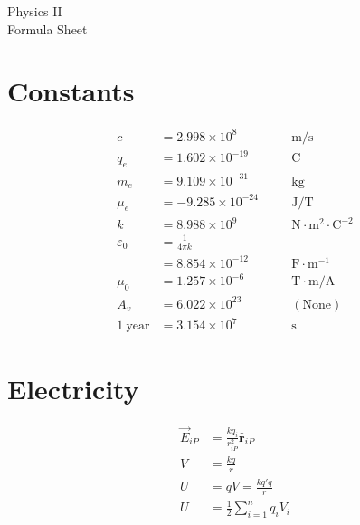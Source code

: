 \documentclass[10pt]{article}
\newcommand{\scinot}[2]{\ensuremath{#1 \times 10^{#2}}}
\begin{document}
\raggedleft
\footnotesize
\begin{multicols*}{5}

\setlength{\premulticols}{1pt}
\setlength{\postmulticols}{1pt}
\setlength{\multicolsep}{1pt}
\setlength{\columnsep}{2pt}

\begin{center}
    \Large
    Physics \textrm{II} \\
    Formula Sheet
\end{center}

\section{Constants}

\begin{alignat*}{2}
    c   &= \scinot{2.998}{8}   && \quad \mathrm{m / s}\\
    q_e &= \scinot{1.602}{-19} && \quad \mathrm{C}\\
    m_e &= \scinot{9.109}{-31} && \quad \mathrm{kg}\\
    \mu_e &= \scinot{-9.285}{-24} && \quad \mathrm{J/T}\\
    k   &= \scinot{8.988}{9}   && \quad \mathrm{N \cdot m^2 \cdot
    C^{-2}}\\
    \varepsilon_0 &= \frac{1}{4\pi k} \\
        &= \scinot{8.854}{-12} && \quad \mathrm{F \cdot m^{-1}}\\
	\mu_0 &= \scinot{1.257}{-6} && \quad \mathrm{T \cdot m/A}\\
    A_v &= \scinot{6.022}{23} && \quad (\text{None})\\
    1 \: \text{year} &= \scinot{3.154}{7} && \quad \mathrm{s}
\end{alignat*}

\section{Electricity}

\begin{align*}
    \vec{E}_{iP} &= \frac{kq_i}{r_{iP}^2} \hat{\mathbf{r}}_{iP}\\
    V &= \frac{kq}{r}\\
    U &= qV = \frac{kq'q}{r}\\
    U &= \frac{1}{2} \sum_{i=1}^n q_i V_i
\end{align*}


\end{multicols*}
\end{document}
